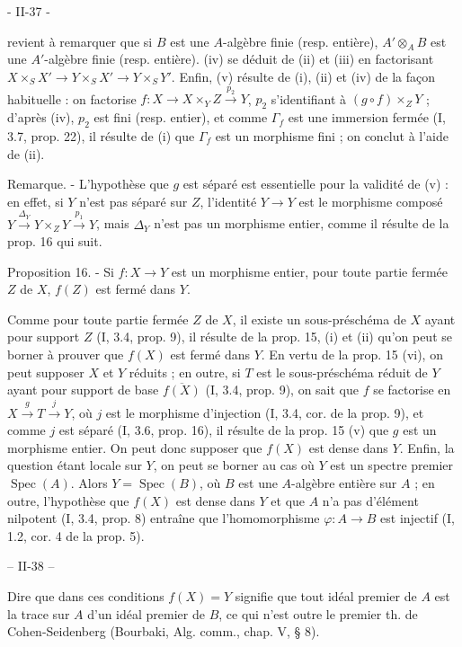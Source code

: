 - II-37 -

revient à remarquer que si $B$ est une $A$-algèbre finie (resp. entière), $A' \otimes_A B$ est une $A'$-algèbre finie (resp. entière). (iv) se déduit de (ii) et (iii) en factorisant $X \times_S X' \to Y \times_S X' \to Y \times_S Y'$. Enfin, (v) résulte de (i), (ii) et (iv) de la façon habituelle : on factorise $f : X \to X \times_Y Z \xrightarrow{p_2} Y$, $p_2$ s'identifiant à $(g \circ f) \times_Z Y$ ; d'après (iv), $p_2$ est fini (resp. entier), et comme $\Gamma_f$ est une immersion fermée (I, 3.7, prop. 22), il résulte de (i) que $\Gamma_f$ est un morphisme fini ; on conclut à l'aide de (ii).

Remarque. - L'hypothèse que $g$ est séparé est essentielle pour la validité de (v) : en effet, si $Y$ n'est pas séparé sur $Z$, l'identité $Y \to Y$ est le morphisme composé $Y \xrightarrow{\Delta_Y} Y \times_Z Y \xrightarrow{p_1} Y$, mais $\Delta_Y$ n'est pas un morphisme entier, comme il résulte de la prop. 16 qui suit.

Proposition 16. - Si $f : X \to Y$ est un morphisme entier, pour toute partie fermée $Z$ de $X$, $f(Z)$ est fermé dans $Y$.

Comme pour toute partie fermée $Z$ de $X$, il existe un sous-préschéma de $X$ ayant pour support $Z$ (I, 3.4, prop. 9), il résulte de la prop. 15, (i) et (ii) qu'on peut se borner à prouver que $f(X)$ est fermé dans $Y$. En vertu de la prop. 15 (vi), on peut supposer $X$ et $Y$ réduits ; en outre, si $T$ est le sous-préschéma réduit de $Y$ ayant pour support de base $\overline{f(X)}$ (I, 3.4, prop. 9), on sait que $f$ se factorise en $X \xrightarrow{g} T \xrightarrow{j} Y$, où $j$ est le morphisme d'injection (I, 3.4, cor. de la prop. 9), et comme $j$ est séparé (I, 3.6, prop. 16), il résulte de la prop. 15 (v) que $g$ est un morphisme entier. On peut donc supposer que $f(X)$ est dense dans $Y$. Enfin, la question étant locale sur $Y$, on peut se borner au cas où $Y$ est un spectre premier $\operatorname{Spec}(A)$. Alors $Y = \operatorname{Spec}(B)$, où $B$ est une $A$-algèbre entière sur $A$ ; en outre, l'hypothèse que $f(X)$ est dense dans $Y$ et que $A$ n'a pas d'élément nilpotent (I, 3.4, prop. 8) entraîne que l'homomorphisme $\varphi : A \to B$ est injectif (I, 1.2, cor. 4 de la prop. 5).

\newpage


\centerline{-- II-38 --}

Dire que dans ces conditions $f(X)=Y$ signifie que tout idéal premier de $A$ est la trace sur $A$ d'un idéal premier de $B$, ce qui n'est outre le premier th. de Cohen-Seidenberg (Bourbaki, Alg. comm., chap. V, § 8).

